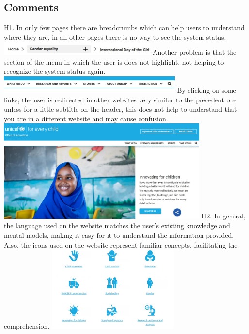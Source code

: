\clearpage

\subsection*{Comments}
H1.	In only few pages there are breadcrumbs which can help users to understand where they are, in all other pages there is no way to see the system status.
\newline \includegraphics[width=0.6\textwidth]{FinalScores1.jpg}
\newline Another problem is that the section of the menu in which the user is does not highlight, not helping to recognize the system status again.
\newline \includegraphics[width=0.7\textwidth]{FinalScores2.jpg}
\newline By clicking on some links, the user is redirected in other websites very similar to the precedent one unless for a little subtitle on the header, this does not help to understand that you are in a different website and may cause confusion.
\newline \includegraphics[width=0.8\textwidth]{FinalScores3.jpg}
\newline
\newline H2.	In general, the language used on the website matches the user’s existing knowledge and mental models, making it easy for it to understand the information provided. Also, the icons used on the website represent familiar concepts, facilitating the comprehension.
\newline \includegraphics[width=0.5\textwidth]{FinalScores4.jpg}
